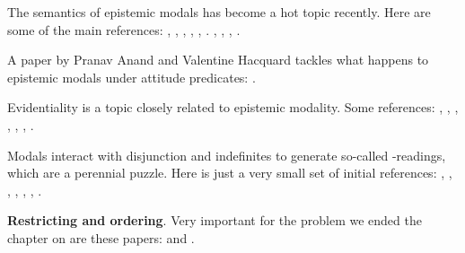 The semantics of epistemic modals has become a hot topic recently. Here are some
of the main references: \cite{hacking-1967-possibility},
\cite{teller-1972-epistemic}, \cite{derose-1991-epistemic},
\cite{egan-hawthorne-weatherson-2005-epistemic}, \cite{egan-2007-epistemic},
\cite{macfarlane-2006-might}. \cite{stephenson-2007-judge-lp},
\cite{hawthorne-2007-danger}, \cite{fintel-gillies-2008-cia-leaks},
\cite{fintel-gillies-2008-mmr}.

A paper by Pranav Anand and Valentine Hacquard tackles what happens to epistemic
modals under attitude predicates:
\cite{anand-hacquard-2013-epistemics-attitudes}.

Evidentiality is a topic closely related to epistemic modality. Some references:
\cite{willett-1988-evidentials}, \cite{aikhenvald-2004-evidentiality},
\cite{drubig-2001-epistemic}, \cite{blain-dechaine-2007-evidentials},
\cite{mccready-ogata-2007-evidentials}, \cite{speas-2008-evidentials},
\cite{fintel-gillies-2010-mss}.

Modals interact with disjunction and indefinites to generate so-called
-readings, which are a perennial puzzle. Here is just a very
small set of initial references: \cite{kamp-1973-freechoice},
\cite{zimmermann-2000-fc-disjunction}, \cite{schulz-2005-fcp-synthese},
\cite{aloni-2007-freechoice}, \cite{alonso-ovalle-2006-thesis},
\cite{fox-2007-freechoice}, \cite{rooij-2006-donkeys}.

\textbf{Restricting and ordering}. Very important for the problem we ended the
chapter on are these papers:
\cite{kaufmann-schwager-2009-conditional-imperatives} and
\cite{condoravdi-lauer-2016-anankastic}. 

